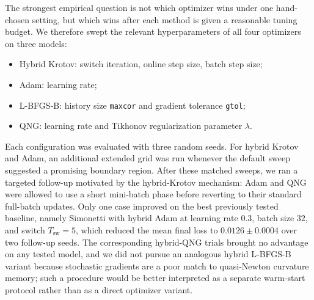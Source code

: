 \documentclass[aps,prb,10pt,twocolumn,superscriptaddress]{revtex4-2}
\begin{document}
The strongest empirical question is not which optimizer wins under one hand-chosen setting, but which wins after each method is given a reasonable tuning budget.
We therefore swept the relevant hyperparameters of all four optimizers on three models:
\begin{itemize}
    \item Hybrid Krotov: switch iteration, online step size, batch step size;
    \item Adam: learning rate;
    \item L-BFGS-B: history size \texttt{maxcor} and gradient tolerance \texttt{gtol};
    \item QNG: learning rate and Tikhonov regularization parameter \(\lambda\).
\end{itemize}
Each configuration was evaluated with three random seeds.
For hybrid Krotov and Adam, an additional extended grid was run whenever the default sweep suggested a promising boundary region.
After these matched sweeps, we ran a targeted follow-up motivated by the hybrid-Krotov mechanism: Adam and QNG were allowed to use a short mini-batch phase before reverting to their standard full-batch updates.
Only one case improved on the best previously tested baseline, namely Simonetti with hybrid Adam at learning rate \(0.3\), batch size \(32\), and switch \(T_{\mathrm{sw}}=5\), which reduced the mean final loss to \(0.0126 \pm 0.0004\) over two follow-up seeds.
The corresponding hybrid-QNG trials brought no advantage on any tested model, and we did not pursue an analogous hybrid L-BFGS-B variant because stochastic gradients are a poor match to quasi-Newton curvature memory; such a procedure would be better interpreted as a separate warm-start protocol rather than as a direct optimizer variant.
\end{document}

